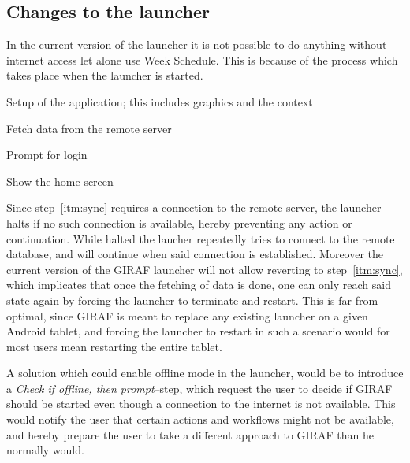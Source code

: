 \subsection{Changes to the launcher}
\label{sub:changes_to_the_launcher}
In the current version of the launcher it is not possible to do anything without internet access let alone use Week Schedule.
This is because of the process which takes place when the launcher is started.
\begin{enumberate}
    \item Setup of the application; this includes graphics and the context
    \item\label{itm:sync} Fetch data from the remote server
    \item Prompt for login
    \item Show the home screen
\end{enumberate}
Since step~\ref{itm:sync} requires a connection to the remote server, the launcher halts if no such connection is available, hereby preventing any action or continuation.
While halted the laucher repeatedly tries to connect to the remote database, and will continue when said connection is established.
Moreover the current version of the GIRAF launcher will not allow reverting to step~\ref{itm:sync}, which implicates that once the fetching of data is done, one can only reach said state again by forcing the launcher to terminate and restart.
This is far from optimal, since GIRAF is meant to replace any existing launcher on a given Android tablet, and forcing the launcher to restart in such a scenario would for most users mean restarting the entire tablet.

\bigskip

A solution which could enable offline mode in the launcher, would be to introduce a \textit{Check if offline, then prompt}--step, which request the user to decide if GIRAF should be started even though a connection to the internet is not available.
This would notify the user that certain actions and workflows might not be available, and hereby prepare the user to take a different approach to GIRAF than he normally would.

